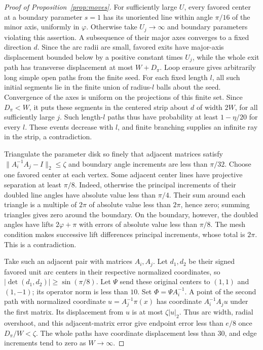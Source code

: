 \begin{proof}[Proof of Proposition~\ref{prop:moves}]
For sufficiently large $U$, every favored center at a boundary
parameter $s=1$ has its unoriented line within angle $\pi/16$ of the
minor axis, uniformly in $\varphi$. Otherwise take $U_j\to\infty$
and boundary parameters violating this assertion. A subsequence of
their major axes converges to a fixed direction $d$. Since the arc
radii are small, favored exits have major-axis displacement bounded
below by a positive constant times $U_j$, while the whole exit path
has transverse displacement at most $W+D_\pi$. Loop erasure gives
arbitrarily long simple open paths from the finite seed. For each
fixed length $l$, all such initial segments lie in the finite union
of radius-$l$ balls about the seed. Convergence of the axes is uniform
on the projections of this finite set. Since $D_\pi<W$, it puts
these segments in the centered strip about $d$ of width $2W$, for
all sufficiently large $j$. Such length-$l$ paths thus have probability at least
$1-\eta/20$ for every $l$. These events decrease with $l$, and finite
branching supplies an infinite ray in the strip, a contradiction.

Triangulate the parameter disk so finely that adjacent matrices
satisfy $\|A_i^{-1}A_j-I\|_2\le\zeta$ and boundary angle increments
are less than $\pi/32$. Choose one favored center at each vertex.
Some adjacent center lines have projective separation at least
$\pi/8$. Indeed, otherwise the principal increments of their doubled
line angles have absolute value less than $\pi/4$. Their sum around
each triangle is a multiple of $2\pi$ of absolute value less than
$2\pi$, hence zero; summing triangles gives zero around the boundary.
On the boundary, however, the doubled angles have lifts
$2\varphi+\pi$ with errors of absolute value less than $\pi/8$.
The mesh condition makes successive lift differences principal
increments, whose total is $2\pi$. This is a contradiction.



Take such an adjacent pair with matrices $A_i,A_j$. Let $d_1,d_2$
be their signed favored unit arc centers in their respective normalized
coordinates, so $|\det(d_1,d_2)|\ge\sin(\pi/8)$. Let $\Psi$ send
these original centers to $(1,1)$ and $(1,-1)$; its operator norm is
less than $10$. Set $\Phi=\Psi A_i^{-1}$. A point of the second path
with normalized coordinate $u=A_j^{-1}\pi(x)$ has coordinate
$A_i^{-1}A_j u$ under the first matrix. Its displacement from $u$
is at most $\zeta|u|_2$. Thus arc width, radial overshoot, and this
adjacent-matrix error give endpoint error less than $e/8$ once
$D_\pi/W<\zeta$. The whole paths have coordinate displacement less
than $30$, and edge increments tend to zero as $W\to\infty$.


\end{proof}
